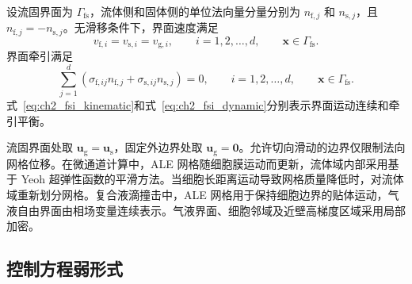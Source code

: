设流固界面为 $\Gamma_{\mathrm{fs}}$，流体侧和固体侧的单位法向量分量分别为 $n_{\mathrm f,j}$ 和 $n_{\mathrm s,j}$，且 $n_{\mathrm f,j}=-n_{\mathrm s,j}$。无滑移条件下，界面速度满足
\begin{equation}
v_{\mathrm f,i}
=
v_{\mathrm s,i}
=
v_{\mathrm g,i},
\qquad
i=1,2,\ldots,d,
\qquad
\boldsymbol{x}\in\Gamma_{\mathrm{fs}}.
\label{eq:ch2_fsi_kinematic}
\end{equation}
界面牵引满足
\begin{equation}
\sum_{j=1}^{d}
\left(
\sigma_{\mathrm f,ij}n_{\mathrm f,j}
+
\sigma_{\mathrm s,ij}n_{\mathrm s,j}
\right)
=0,
\qquad
i=1,2,\ldots,d,
\qquad
\boldsymbol{x}\in\Gamma_{\mathrm{fs}}.
\label{eq:ch2_fsi_dynamic}
\end{equation}
式~\eqref{eq:ch2_fsi_kinematic}和式~\eqref{eq:ch2_fsi_dynamic}分别表示界面运动连续和牵引平衡\cite{hou2012numerical}。

流固界面处取 $\boldsymbol{u}_{\mathrm g}=\boldsymbol{u}_{\mathrm s}$，固定外边界处取 $\boldsymbol{u}_{\mathrm g}=\boldsymbol{0}$。允许切向滑动的边界仅限制法向网格位移。在微通道计算中，ALE 网格随细胞膜运动而更新，流体域内部采用基于 Yeoh 超弹性函数的平滑方法\cite{yeoh1993some}。当细胞长距离运动导致网格质量降低时，对流体域重新划分网格。复合液滴撞击中，ALE 网格用于保持细胞边界的贴体运动，气液自由界面由相场变量连续表示。气液界面、细胞邻域及近壁高梯度区域采用局部加密。

\subsection{控制方程弱形式}
\label{subsec:ch2_weak_form}

